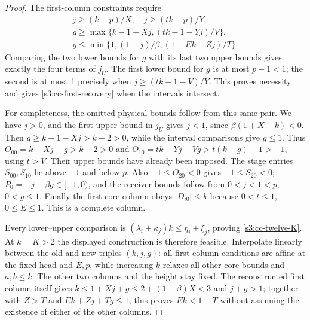 \documentclass[11pt,reqno]{amsart}
\theoremstyle{definition}
\theoremstyle{remark}
\begin{document}
\begin{proof}
The first-column constraints require
\[
\begin{gathered} j\ge(k-p)/X,\quad j\ge(tk-p)/Y,\\
 g\ge\max\{k-1-Xj,(tk-1-Yj)/V\},\\
 g\le\min\{1,(1-j)/\beta,(1-Ek-Zj)/T\}.\end{gathered}
\]
Comparing the two lower bounds for \(g\) with its last two upper
bounds gives exactly the four terms of \(j_U\). The first lower
bound for \(g\) is at most \(p-1<1\); the second is at most
1 precisely when \(j\ge(tk-1-V)/Y\). This proves necessity
and gives \eqref{s3:cc-first-recovery} when the intervals intersect.

For completeness, the omitted physical bounds follow from this same
pair. We have \(j>0\), and the first upper bound in \(j_U\)
gives \(j<1\), since
\(\beta(1+X-k)<0\). Then \(g\ge k-1-Xj>k-2>0\),
while the interval comparisons give \(g\le1\).
Thus \(O_{00}=k-Xj-g>k-2>0\) and
\(O_{10}=tk-Yj-Vg>t(k-g)-1>-1\), using \(t>V\).
Their upper bounds have already been imposed.
The stage entries \(S_{00},S_{10}\) lie above \(-1\) and
below \(p\). Also \(-1\le O_{20}<0\) gives
\(-1\le S_{20}<0\); \(P_0=-j-\beta g\in[-1,0)\),
and the receiver bounds follow from \(0<j<1<p\), \(0<g\le1\).
Finally the first core column obeys \(|D_{i0}|\le k\) because
\(0<t\le1\), \(0\le E\le1\). This is a complete column.

Every lower--upper comparison is
\((\lambda_i+\kappa_j)k\le\eta_i+\xi_j\), proving
\eqref{s3:cc-twelve-K}. At \(k=K>2\) the displayed construction
is therefore feasible. Interpolate linearly between the old and new
triples \((k,j,g)\): all first-column conditions are affine at the
fixed head and \(E,p\), while increasing \(k\) relaxes all other
core bounds and \(a,b\le k\). The other two columns and the
height stay fixed. The reconstructed first column itself gives
\(k\le1+Xj+g\le2+(1-\beta)X<3\) and
\(j+g>1\); together with \(Z>T\) and
\(Ek+Zj+Tg\le1\), this proves \(Ek<1-T\) without assuming
the existence of either of the other columns.
\end{proof}
\end{document}

